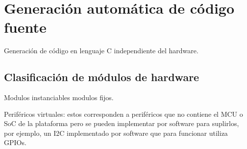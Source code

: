 \section{Generación automática de código fuente}
\label{sec:codeGeneration}

Generación de código en lenguaje C independiente del hardware.



\subsection{Clasificación de módulos de hardware}

Modulos instanciables modulos fijos.

Periféricos virtuales: estos corresponden a periféricos que no contiene el MCU o SoC de la plataforma pero se pueden implementar por software para suplirlos, por ejemplo, un I2C implementado por software que para funcionar utiliza GPIOs.

